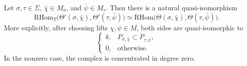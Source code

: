 \begin{proposition}
\label{prop:hom-complex-comparison}
Let \(\sigma,\tau\in\Sigma\), \(\bar\chi\in M_\sigma\), and
\(\bar\psi\in M_\tau\). Then there is a natural quasi-isomorphism
\[
\mathrm{RHom}_T\bigl(\Theta'(\sigma,\bar\chi),
\Theta'(\tau,\bar\psi)\bigr)
\simeq
\mathrm{RHom}\bigl(\Theta(\sigma,\bar\chi),
\Theta(\tau,\bar\psi)\bigr).
\]
More explicitly, after choosing lifts \(\chi,\psi\in M\), both sides are
quasi-isomorphic to
\[
\begin{cases}
k, & P_{\sigma,\bar\chi}\subset P_{\tau,\bar\psi},\\
0, & \text{otherwise}.
\end{cases}
\]
In the nonzero case, the complex is concentrated in degree zero.
\end{proposition}

